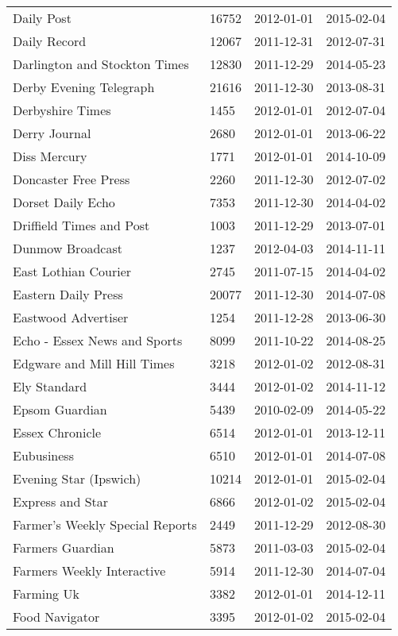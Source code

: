 \begin{longtable}{p{}p{}p{}p{}}
  Daily Post & 16752 & 2012-01-01 & 2015-02-04 \\ 
  Daily Record & 12067 & 2011-12-31 & 2012-07-31 \\ 
  Darlington and Stockton Times & 12830 & 2011-12-29 & 2014-05-23 \\ 
  Derby Evening Telegraph & 21616 & 2011-12-30 & 2013-08-31 \\ 
  Derbyshire Times & 1455 & 2012-01-01 & 2012-07-04 \\ 
  Derry Journal & 2680 & 2012-01-01 & 2013-06-22 \\ 
  Diss Mercury & 1771 & 2012-01-01 & 2014-10-09 \\ 
  Doncaster Free Press & 2260 & 2011-12-30 & 2012-07-02 \\ 
  Dorset Daily Echo & 7353 & 2011-12-30 & 2014-04-02 \\ 
  Driffield Times and Post & 1003 & 2011-12-29 & 2013-07-01 \\ 
  Dunmow Broadcast & 1237 & 2012-04-03 & 2014-11-11 \\ 
  East Lothian Courier & 2745 & 2011-07-15 & 2014-04-02 \\ 
  Eastern Daily Press & 20077 & 2011-12-30 & 2014-07-08 \\ 
  Eastwood Advertiser & 1254 & 2011-12-28 & 2013-06-30 \\ 
  Echo - Essex News and Sports & 8099 & 2011-10-22 & 2014-08-25 \\ 
  Edgware and Mill Hill Times & 3218 & 2012-01-02 & 2012-08-31 \\ 
  Ely Standard & 3444 & 2012-01-02 & 2014-11-12 \\ 
  Epsom Guardian & 5439 & 2010-02-09 & 2014-05-22 \\ 
  Essex Chronicle & 6514 & 2012-01-01 & 2013-12-11 \\ 
  Eubusiness & 6510 & 2012-01-01 & 2014-07-08 \\ 
  Evening Star (Ipswich) & 10214 & 2012-01-01 & 2015-02-04 \\ 
  Express and Star & 6866 & 2012-01-02 & 2015-02-04 \\ 
  Farmer's Weekly Special Reports & 2449 & 2011-12-29 & 2012-08-30 \\ 
  Farmers Guardian & 5873 & 2011-03-03 & 2015-02-04 \\ 
  Farmers Weekly Interactive & 5914 & 2011-12-30 & 2014-07-04 \\ 
  Farming Uk & 3382 & 2012-01-01 & 2014-12-11 \\ 
  Food Navigator & 3395 & 2012-01-02 & 2015-02-04 \\ 

\end{longtable}

